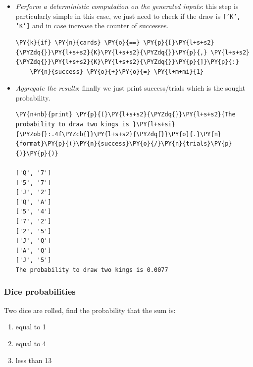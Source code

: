 \begin{itemize}
\begin{tcolorbox}[breakable, size=fbox, boxrule=1pt, pad at break*=1mm,colback=cellbackground, colframe=cellborder]
\begin{Verbatim}[commandchars=\\\{\}]
\PY{k}{for} \PY{n}{i} \PY{o+ow}{in} \PY{n+nb}{range}\PY{p}{(}\PY{n}{trials}\PY{p}{)}\PY{p}{:}
  \PY{n}{cards} \PY{o}{=} \PY{n}{sample}\PY{p}{(}\PY{n}{deck}\PY{p}{,} \PY{n}{k}\PY{o}{=}\PY{l+m+mi}{2}\PY{p}{)}
  \PY{k}{if} \PY{n}{i} \PY{o}{\PYZlt{}} \PY{l+m+mi}{10}\PY{p}{:}
    \PY{n+nb}{print} \PY{p}{(}\PY{n}{cards}\PY{p}{)}
\end{Verbatim}
\end{tcolorbox}

\item \emph{Perform a deterministic computation on the generated inputs}: this step is particularly simple in this case, we just need to check if the draw is \texttt{['K', 'K']} and in case increase the counter of successes.

\begin{tcolorbox}[breakable, size=fbox, boxrule=1pt, pad at break*=1mm,colback=cellbackground, colframe=cellborder]
\begin{Verbatim}[commandchars=\\\{\}]
  \PY{k}{if} \PY{n}{cards} \PY{o}{==} \PY{p}{[}\PY{l+s+s2}{\PYZdq{}}\PY{l+s+s2}{K}\PY{l+s+s2}{\PYZdq{}}\PY{p}{,} \PY{l+s+s2}{\PYZdq{}}\PY{l+s+s2}{K}\PY{l+s+s2}{\PYZdq{}}\PY{p}{]}\PY{p}{:}
    \PY{n}{success} \PY{o}{+}\PY{o}{=} \PY{l+m+mi}{1}
 \end{Verbatim}
\end{tcolorbox}

\item \emph{Aggregate the results}: finally we just print success/trials which is the sought probability.

\begin{tcolorbox}[breakable, size=fbox, boxrule=1pt, pad at break*=1mm,colback=cellbackground, colframe=cellborder]
\begin{Verbatim}[commandchars=\\\{\}]
\PY{n+nb}{print} \PY{p}{(}\PY{l+s+s2}{\PYZdq{}}\PY{l+s+s2}{The probability to draw two kings is }\PY{l+s+si}{\PYZob{}:.4f\PYZcb{}}\PY{l+s+s2}{\PYZdq{}}\PY{o}{.}\PY{n}{format}\PY{p}{(}\PY{n}{success}\PY{o}{/}\PY{n}{trials}\PY{p}{)}\PY{p}{)}

['Q', '7']
['5', '7']
['J', '2']
['Q', 'A']
['5', '4']
['7', '2']
['2', '5']
['J', 'Q']
['A', 'Q']
['J', '5']
The probability to draw two kings is 0.0077
    \end{Verbatim}
\end{tcolorbox}
\end{itemize}

\subsubsection{Dice probabilities}
Two dice are rolled, find the probability that the sum is:
\begin{enumerate}
\item equal to 1
\item equal to 4
\item less than 13
\end{enumerate}

